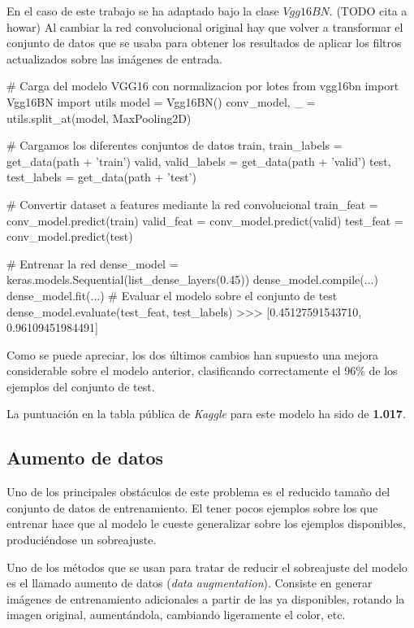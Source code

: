 En el caso de este trabajo se ha adaptado bajo la clase $Vgg16BN$. (TODO cita a howar) Al cambiar la red convolucional original hay que volver a transformar el conjunto de datos que se usaba para obtener los resultados de aplicar los filtros actualizados sobre las imágenes de entrada.

\begin{python}
# Carga del modelo VGG16 con normalizacion por lotes
from vgg16bn import Vgg16BN
import utils
model = Vgg16BN()
conv_model, _ = utils.split_at(model, MaxPooling2D)

# Cargamos los diferentes conjuntos de datos
train, train_labels = get_data(path + 'train')
valid, valid_labels = get_data(path + 'valid')
test, test_labels = get_data(path + 'test')

# Convertir dataset a features mediante la red convolucional
train_feat = conv_model.predict(train)
valid_feat = conv_model.predict(valid)
test_feat = conv_model.predict(test)

# Entrenar la red
dense_model = keras.models.Sequential(list_dense_layers(0.45))
dense_model.compile(...)
dense_model.fit(...)
# Evaluar el modelo sobre el conjunto de test
dense_model.evaluate(test_feat, test_labels)
>>> [0.45127591543710, 0.96109451984491]
\end{python}

Como se puede apreciar, los dos últimos cambios han supuesto una mejora considerable sobre el modelo anterior, clasificando correctamente el 96\% de los ejemplos del conjunto de test.

La puntuación en la tabla pública de \textit{Kaggle} para este modelo ha sido
de \textbf{1.017}.


\subsection{Aumento de datos}

Uno de los principales obstáculos de este problema es el reducido tamaño del conjunto de datos de entrenamiento. El tener pocos ejemplos sobre los que entrenar hace que al modelo le cueste generalizar sobre los ejemplos disponibles, produciéndose un sobreajuste.

Uno de los métodos que se usan para tratar de reducir el sobreajuste del modelo es el llamado aumento de datos (\textit{data augmentation}). Consiste en generar imágenes de entrenamiento adicionales a partir de las ya disponibles, rotando la imagen original, aumentándola, cambiando ligeramente el color, etc.

